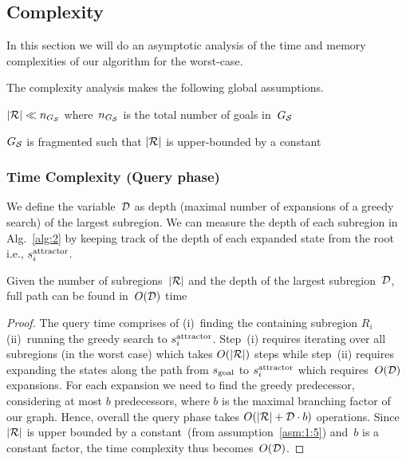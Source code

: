 \documentclass[a4paper]{report}
\begin{document}
\subsection{Complexity}
In this section we will do an asymptotic analysis of the time and memory complexities of our algorithm for the worst-case.

The complexity analysis makes the following global assumptions.
\vspace{2mm}\begin{assumption}
\label{asm:1:4} $|\mathcal{R}| \ll n_{G_{\mathcal{S}}}$ where~$n_{G_{\mathcal{S}}}$ is the total number of goals in~$G_\mathcal{S}$
\end{assumption}
\vspace{2mm}\begin{assumption}
\label{asm:1:5} $G_\mathcal{S}$ is fragmented such that $|\mathcal{R}|$ is upper-bounded by a constant
\end{assumption}

\label{subsec:complexity}
\subsubsection{Time Complexity (Query phase)}
We define the variable~$\mathcal{D}$ as depth (maximal number of expansions of a greedy search) of the largest subregion. We can measure the depth of each subregion in Alg.~\ref{alg:2} by keeping track of the depth of each expanded state from the root i.e., $s^{\text{attractor}}_i$.
%
\vspace{2mm}
\begin{lemma}
\label{lemma:unboundedD}
Given the number of subregions~$|\mathcal{R}|$ and the depth of the largest subregion~$\mathcal{D}$, full path can be found in~$O(\mathcal{D})$ time
\end{lemma}

\begin{proof}
The query time comprises of 
(i)~finding the containing subregion $R_i$
(ii)~running the greedy search to $s^{\text{attractor}}_i$.
Step~(i) requires iterating over all subregions (in the worst case) which takes $O(|\mathcal{R}|)$ steps while 
step~(ii) requires expanding the states along the path from $s_{\text{goal}}$ to $s^{\text{attractor}}_i$ which requires~$O(\mathcal{D})$ expansions.
For each expansion we need to find the greedy predecessor, considering at most $b$ predecessors, where $b$ is the maximal branching factor of our graph.
Hence, overall the query phase takes $O(|\mathcal{R}| + \mathcal{D} \cdot b)$ operations. Since~$|\mathcal{R}|$ is upper bounded by a constant~(from assumption~\ref{asm:1:5}) and~$b$ is a constant factor, the time complexity thus becomes~$O(\mathcal{D})$.
\end{proof}
\end{document}

